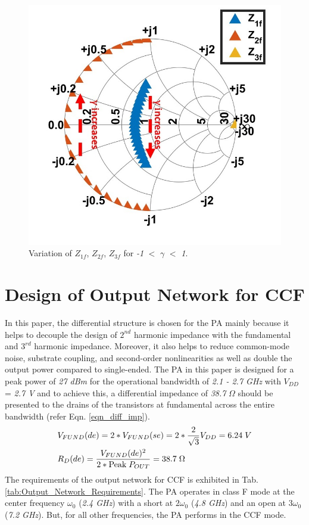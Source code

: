 \documentclass[conference]{IEEEtran}
\begin{document}
\begin{figure}[!t]
\centering
\captionsetup{font=footnotesize}
\includegraphics[width=0.63\linewidth]{Images/CCF/CCF_SC.jpg}
\caption{Variation of $Z_{1f}$, $Z_{2f}$, $Z_{3f}$ for \textit{-1} $<$ $\gamma$ $<$ \textit{1}.}
\label{fig:CCF_SC}
\vspace{-0.05in}
\end{figure}
 

\section{Design of Output Network for CCF}
\label{section:ON}
In this paper, the differential structure is chosen for the PA mainly because it helps to decouple the design of $2^{nd}$ harmonic impedance with the fundamental and $3^{rd}$ harmonic impedance. Moreover, it also helps to reduce common-mode noise, substrate coupling, and second-order nonlinearities as well as double the output power compared to single-ended. 
The PA in this paper is designed for a peak power of \textit{27 dBm} for the operational bandwidth of \textit{2.1 - 2.7 GHz} with $V_{DD}$ = \textit{2.7 V} and to achieve this, a differential impedance of \textit{38.7} $\Omega$ should be presented to the drains of the transistors at fundamental across the entire bandwidth (refer Eqn. \ref{eqn_diff_imp}). 
\vspace{-0.05in}
\begin{equation}
\begin{aligned}
&V_{FUND}(de)=2*V_{FUND}(se)=2*\frac{2}{\sqrt{3}} V_{DD}=6.24 \hspace{1mm}V\\
&R_{D}(de)=\frac{V_{FUND}(de)^{2}}{2*\text{Peak} \hspace{1mm} P_{OUT}}=38.7 \hspace{1mm} \Omega
\label{eqn_diff_imp}
\end{aligned}
\end{equation}
The requirements of the output network for CCF is exhibited in Tab. \ref{tab:Output_Network_Requirements}. The PA operates in class F mode at the center frequency $\omega_0$ (\textit{2.4 GHz}) with a short at $2\omega_0$ (\textit{4.8 GHz}) and an open at $3\omega_0$ (\textit{7.2 GHz}). But, for all other frequencies, the PA performs in the CCF mode. 
\end{document}
